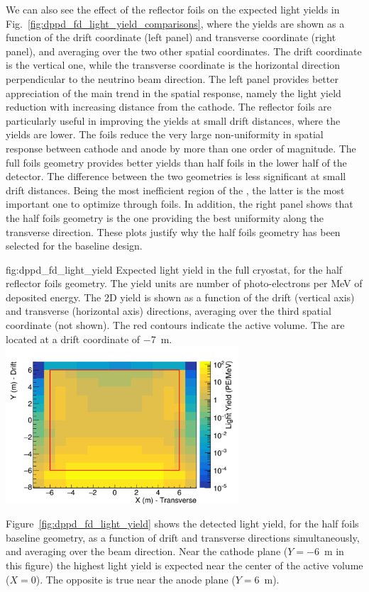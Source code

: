 We can also see the effect of the  reflector foils on the expected light yields in Fig.~\ref{fig:dppd_fd_light_yield_comparisons}, where the yields are shown as a function of the drift coordinate (left panel) and transverse coordinate (right panel), and averaging over the two other spatial coordinates. The drift coordinate is the vertical one, while the transverse coordinate is the horizontal direction perpendicular to the neutrino beam direction. The left panel provides better appreciation of the main trend in the spatial response, namely the light yield reduction with increasing distance from the cathode. The  reflector foils are particularly useful in improving the yields at small drift distances, where the yields are lower. The foils reduce the very large non-uniformity in spatial response between cathode and anode by more than one order of magnitude. The full foils geometry provides better yields than half foils in the lower half of the detector. The difference between the two geometries is less significant at small drift distances. Being the most inefficient region of the , the latter is the most important one to optimize through foils. In addition, the right panel shows that the half foils geometry is the one providing the best uniformity along the transverse direction. These plots justify why the half  foils geometry has been selected for the  baseline design.     

\begin{dunefigure}{fig:dppd_fd_light_yield}
{Expected light yield in the full   cryostat, for the half  reflector foils geometry. The yield units are number of photo-electrons per \si{\MeV} of deposited energy. The 2D yield is shown as a function of the drift (vertical axis) and transverse (horizontal axis) directions, averaging over the third spatial coordinate (not shown). The red contours indicate the  active volume. The  are located at a drift coordinate of \SI{-7}{\m}.}
\includegraphics[width=0.65\textwidth]{graphics/dppd_PhotLibHalfFoil_longuerrange.pdf} 
\end{dunefigure}

Figure~\ref{fig:dppd_fd_light_yield} shows the detected light yield, for the half foils baseline geometry, as a function of drift and transverse directions simultaneously, and averaging over the beam direction. Near the cathode plane ($Y=$\SI{-6}{m} in this figure) the highest light yield is expected near the center of the active volume ($X=0$). The opposite is true near the anode plane ($Y=$\SI{+6}{m}).  

